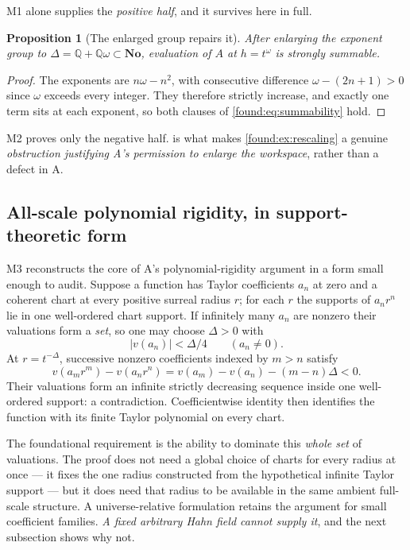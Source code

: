 \documentclass[11pt,letterpaper]{article}
\numberwithin{equation}{section}
\newtheorem{proposition}[theorem]{Proposition}
\theoremstyle{definition}
\theoremstyle{remark}
\newcommand{\No}{\mathbf{No}}
\newcommand{\Q}{\mathbb Q}
\begin{document}
M1 alone supplies the \emph{positive half}, and it survives here in full.

\begin{proposition}[The enlarged group repairs it]\label{found:prop:rescalingpositive}
After enlarging the exponent group to $\Delta=\Q+\Q\omega\subset\No$,
evaluation of $A$ at $h=t^\omega$ \emph{is} strongly summable.
\end{proposition}
\begin{proof}
The exponents are $n\omega-n^2$, with consecutive difference
$\omega-(2n+1)>0$ since $\omega$ exceeds every integer. They therefore strictly
increase, and exactly one term sits at each exponent, so both clauses of
\eqref{found:eq:summability} hold.
\end{proof}

M2 proves only the negative half.  is what
makes \cref{found:ex:rescaling} a genuine \emph{obstruction justifying A's
permission to enlarge the workspace}, rather than a defect in A.

\subsection{All-scale polynomial rigidity, in support-theoretic form}
\label{found:sub:rigidityargument}
M3 reconstructs the core of A's polynomial-rigidity argument in a form small
enough to audit. Suppose a function has Taylor coefficients $a_n$ at zero and a
coherent chart at every positive surreal radius $r$; for each $r$ the supports
of $a_nr^n$ lie in one well-ordered chart support. If infinitely many $a_n$ are
nonzero their valuations form a \emph{set}, so one may choose $\Delta>0$ with
\begin{equation}\label{found:eq:deltachoice}
 |v(a_n)|<\Delta/4\qquad(a_n\ne0).
\end{equation}
At $r=t^{-\Delta}$, successive nonzero coefficients indexed by $m>n$ satisfy
\begin{equation}\label{found:eq:rigiditycomputation}
 v(a_mr^m)-v(a_nr^n)=v(a_m)-v(a_n)-(m-n)\Delta<0 .
\end{equation}
Their valuations form an infinite strictly decreasing sequence inside one
well-ordered support: a contradiction. Coefficientwise identity then identifies
the function with its finite Taylor polynomial on every chart.

The foundational requirement is the ability to dominate this \emph{whole set} of
valuations. The proof does not need a global choice of charts for every radius
at once --- it fixes the one radius constructed from the hypothetical infinite
Taylor support --- but it does need that radius to be available in the same
ambient full-scale structure. A universe-relative formulation retains the
argument for small coefficient families. \emph{A fixed arbitrary Hahn field
cannot supply it}, and the next subsection shows why not.
\end{document}
